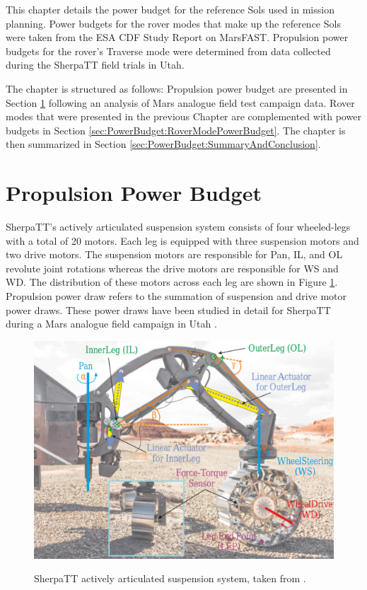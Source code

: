 This chapter details the power budget for the reference Sols used in mission planning. Power budgets for the rover modes that make up the reference Sols were taken from the \ac{ESA} \ac{CDF} Study Report on MarsFAST. Propulsion power budgets for the rover's Traverse mode were determined from data collected during the SherpaTT field trials in Utah.

The chapter is structured as follows: Propulsion power budget are presented in Section \ref{sec:PowerBudget:PropulsionPowerBudget} following an analysis of Mars analogue field test campaign data. Rover modes that were presented in the previous Chapter are complemented with power budgets in Section \ref{sec:PowerBudget:RoverModePowerBudget}. The chapter is then summarized in Section \ref{sec:PowerBudget:SummaryAndConclusion}.

\section{Propulsion Power Budget}
\label{sec:PowerBudget:PropulsionPowerBudget}
SherpaTT's actively articulated suspension system consists of four wheeled-legs with a total of 20 motors. Each leg is equipped with three suspension motors and two drive motors. The suspension motors are responsible for Pan, \ac{IL}, and \ac{OL} revolute joint rotations whereas the drive motors are responsible for \ac{WS} and \ac{WD}. The distribution of these motors across each leg are shown in Figure \ref{fig:sherpatt-actively-articulated-suspension-system}. Propulsion power draw refers to the summation of suspension and drive motor power draws. These power draws have been studied in detail for SherpaTT during a Mars analogue field campaign in Utah .

\begin{figure}[h]
  \centering
  \hypersetup{linkcolor=captionTextColor}
  \includegraphics[width=0.6\linewidth]{sections/locomotion-power-draws/images/sherpatt-actively-articulated-suspension-sytem.png}\\
  \caption[SherpaTT actively articulated suspension system]
          {SherpaTT actively articulated suspension system, taken from .}
  \label{fig:sherpatt-actively-articulated-suspension-system}
\end{figure}

